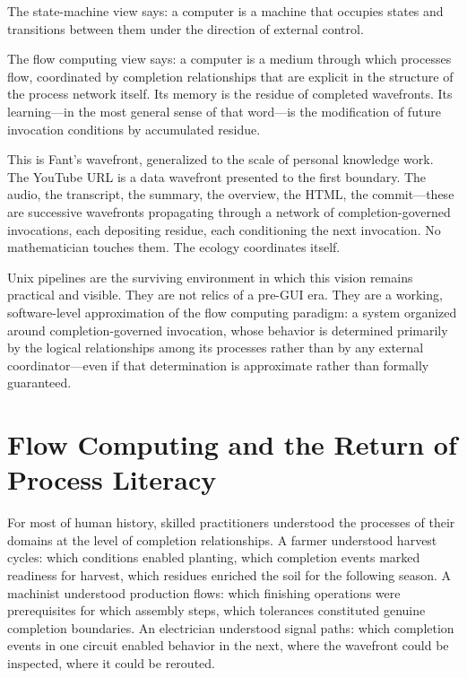 \documentclass[12pt, a4paper]{article}
\begin{document}
The state-machine view says: a computer is a machine that occupies
states and transitions between them under the direction of external
control.

The flow computing view says: a computer is a medium through which
processes flow, coordinated by completion relationships that are
explicit in the structure of the process network itself. Its memory
is the residue of completed wavefronts. Its learning---in the most
general sense of that word---is the modification of future invocation
conditions by accumulated residue.

This is Fant's wavefront, generalized to the scale of personal
knowledge work. The YouTube URL is a data wavefront presented to
the first boundary. The audio, the transcript, the summary, the
overview, the HTML, the commit---these are successive wavefronts
propagating through a network of completion-governed invocations,
each depositing residue, each conditioning the next invocation.
No mathematician touches them. The ecology coordinates itself.

Unix pipelines are the surviving environment in which this vision
remains practical and visible. They are not relics of a pre-GUI
era. They are a working, software-level approximation of the flow
computing paradigm: a system organized around completion-governed
invocation, whose behavior is determined primarily by the logical
relationships among its processes rather than by any external
coordinator---even if that determination is approximate rather than
formally guaranteed.

\section{Flow Computing and the Return of Process Literacy}

For most of human history, skilled practitioners understood the
processes of their domains at the level of completion relationships.
A farmer understood harvest cycles: which conditions enabled
planting, which completion events marked readiness for harvest,
which residues enriched the soil for the following season. A
machinist understood production flows: which finishing operations
were prerequisites for which assembly steps, which tolerances
constituted genuine completion boundaries. An electrician understood
signal paths: which completion events in one circuit enabled
behavior in the next, where the wavefront could be inspected,
where it could be rerouted.
\end{document}
